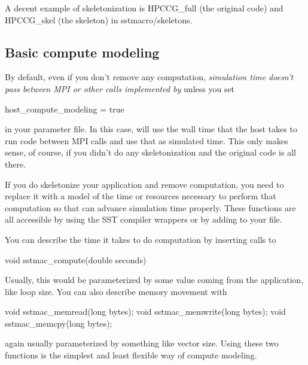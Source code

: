 A decent example of skeletonization is HPCCG\_full (the original code) and HPCCG\_skel (the skeleton) in sstmacro/skeletons.  

\subsection{Basic compute modeling}

By default, even if you don't remove any computation, \textit{simulation time doesn't pass between MPI or other calls implemented by \sstmacro} unless you set

\begin{ViFile}
host_compute_modeling = true
\end{ViFile}

in your parameter file.  In this case, \sstmacro will use the wall time that the host takes to run code between MPI calls and use that as simulated time.  This only makes sense, of course, if you didn't do any skeletonization and the original code is all there. 

If you do skeletonize your application and remove computation, you need to replace it with a model of the time or resources necessary to perform that computation so that \sstmacro can advance simulation time properly. 
These functions are all accessible by using the SST compiler wrappers or by adding  to your file.

You can describe the time it takes to do computation by inserting calls to 

\begin{ViFile}
void sstmac_compute(double seconds)
\end{ViFile}
Usually, this would be parameterized by some value coming from the application, like loop size.   You can also describe memory movement with 

\begin{ViFile}
void sstmac_memread(long bytes);
void sstmac_memwrite(long bytes);
void sstmac_memcpy(long bytes);
\end{ViFile}
again usually parameterized by something like vector size.  
Using these two functions is the simplest and least flexible way of compute modeling.

